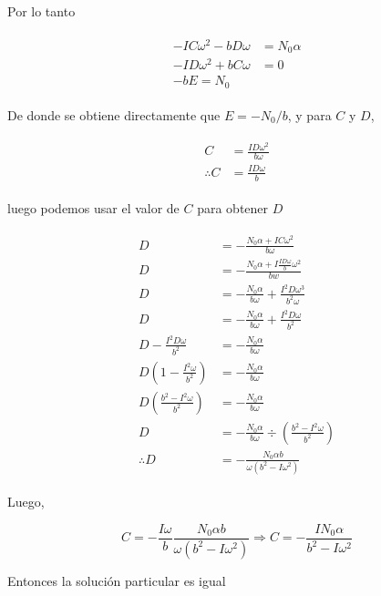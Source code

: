 \documentclass[a4paper,10pt]{article}
\numberwithin{equation}{section}
\begin{document}
Por lo tanto

\begin{align*}
 \begin{split}
  -IC\omega^2 - bD\omega &= N_0 \alpha \\
  -ID\omega^2+bC\omega &= 0 \\
  - bE = N_0
 \end{split}
\end{align*}

De donde se obtiene directamente que $E = -N_0/b$, y para $C$ y $D$, 

\begin{align*}
 \begin{split}
  C &= \frac{ID\omega^2}{b\omega} \\
  \therefore C &= \frac{ID\omega}{b} 
 \end{split}
\end{align*}

luego podemos usar el valor de $C$ para obtener $D$

\begin{align*}
 \begin{split}
  D &= - \frac{N_0 \alpha + IC\omega^2}{b\omega} \\
  D &= - \frac{N_0 \alpha + I \frac{ID\omega}{b} \omega^2}{bw} \\
  D &= - \frac{N_0 \alpha}{b\omega} + \frac{I^2 D \omega^3}{b^2\omega} \\
  D &= - \frac{N_0 \alpha}{b\omega} + \frac{I^2D\omega}{b^2} \\
  D - \frac{I^2D\omega}{b^2} &= - \frac{N_0 \alpha}{b\omega} \\
  D  \left(1 - \frac{I^2\omega}{b^2} \right) &= - \frac{N_0 \alpha}{b\omega} \\
  D \left(\frac{b^2-I^2\omega}{b^2} \right) &= - \frac{N_0 \alpha}{b\omega} \\
  D &= - \frac{N_0\alpha}{b\omega} \div \left(\frac{b^2-I^2\omega}{b^2} \right) \\
  \therefore D &= - \frac{N_0 \alpha b}{\omega(b^2-I\omega^2)}
 \end{split}
\end{align*}

Luego,

$$
C = - \frac{I\omega}{b}  \frac{N_0 \alpha b}{\omega(b^2-I\omega^2)} 
\Rightarrow C = - \frac{IN_0 \alpha}{b^2-I\omega^2}
$$

Entonces la solución particular es igual 
\end{document}
